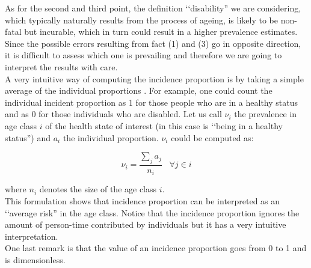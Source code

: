 As for the second and third point, the definition \lq\lq disability'' we are considering, which typically naturally results from the process of ageing, is likely to be non-fatal but incurable, which in turn could result in a higher prevalence estimates. \\

Since the possible errors resulting from fact (1) and (3) go in opposite direction, it is difficult to assess which one is prevailing and therefore we are going to interpret the results with care. \\








A very intuitive way of computing the incidence proportion is by taking a simple average of the individual proportions \citep{Rothman2008ModernEpidemiology}.  For example, one could count the individual incident proportion as 1 for those people who are in a healthy status and as 0 for those individuals who are disabled. Let us call $\nu_i$ the prevalence in age class $i$ of the health state of interest (in this case is \lq\lq being in a healthy status'') and $a_i$ the individual proportion. $\nu_i$ could be computed as:

\begin{equation}
    \nu_i = \frac{\sum_{j} a_j }{n_i} \;\;\; \forall j \in i
\end{equation}

where $n_i$ denotes the size of the age class $i$.\\
This formulation shows that incidence proportion can be interpreted as an \lq\lq average risk'' in the age class. Notice that the incidence proportion ignores the amount of person-time contributed by individuals but it has a very intuitive interpretation.\\
One last remark is that the value of an incidence proportion goes from 0 to 1 and is dimensionless. 






